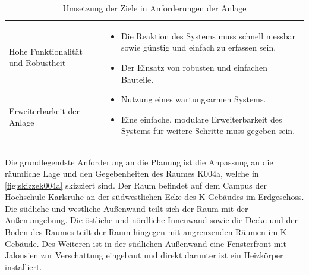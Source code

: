 \begin{table}[H]
\begin{tabularx}{1\textwidth}{m{}m{}}
& \multirow{3}{\hsize}{
\begin{minipage}[t]{0.57\textwidth}
\begin{itemize}[itemsep=0pt,topsep=0pt,leftmargin=5mm]
\item Die Reaktion des Systems muss schnell messbar sowie günstig und einfach zu erfassen sein.
\item Der Einsatz von robusten und einfachen Bauteile.
\item Nutzung eines wartungsarmen Systems.
\item Eine einfache, modulare Erweiterbarkeit des Systems für weitere Schritte muss gegeben sein.
\end{itemize}
\end{minipage}
}  \\

\cmidrule[0.1pt](lr{2em}){1-1} 

Hohe Funktionalität und \newline Robustheit & \\

\cmidrule[0.1pt](lr{2em}){1-1} 

Erweiterbarkeit der Anlage
 &  \\

\bottomrule
\end{tabularx}
\caption{Umsetzung der Ziele in Anforderungen der Anlage}
\label{tab:anforderungen_umgebung}
\end{table}

Die grundlegendste Anforderung an die Planung ist die Anpassung an die räumliche Lage und den Gegebenheiten des Raumes K004a, welche in \ref{fig:skizzek004a} skizziert sind. 
Der Raum befindet auf dem Campus der Hochschule Karlsruhe an der südwestlichen Ecke des K Gebäudes im Erdgeschoss. Die südliche und westliche Außenwand teilt sich der Raum mit der Außenumgebung. Die östliche und nördliche Innenwand sowie die Decke und der Boden des Raumes teilt der Raum hingegen mit angrenzenden Räumen im K Gebäude. Des Weiteren ist in der südlichen Außenwand eine Fensterfront mit Jalousien zur Verschattung eingebaut und direkt darunter ist ein Heizkörper installiert.

